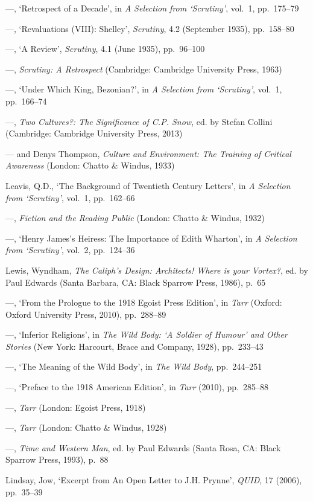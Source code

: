 \documentclass[]{article}
\begin{document}
---, `Retrospect of a Decade', in \emph{A Selection from `Scrutiny'},
vol.~1, pp.~175--79

---, `Revaluations (VIII): Shelley', \emph{Scrutiny}, 4.2 (September
1935), pp.~158--80

---, `A Review', \emph{Scrutiny}, 4.1 (June 1935), pp.~96--100

---, \emph{Scrutiny: A Retrospect} (Cambridge: Cambridge University
Press, 1963)

---, `Under Which King, Bezonian?', in \emph{A Selection from
`Scrutiny'}, vol.~1, pp.~166--74

---, \emph{Two Cultures?: The Significance of C.P. Snow}, ed. by Stefan
Collini (Cambridge: Cambridge University Press, 2013)

--- and Denys Thompson, \emph{Culture and Environment: The Training of
Critical Awareness} (London: Chatto \& Windus, 1933)

Leavis, Q.D., `The Background of Twentieth Century Letters', in \emph{A
Selection from `Scrutiny'}, vol.~1, pp.~162--66

---, \emph{Fiction and the Reading Public} (London: Chatto \& Windus,
1932)

---, `Henry James's Heiress: The Importance of Edith Wharton', in
\emph{A Selection from `Scrutiny'}, vol.~2, pp.~124--36

Lewis, Wyndham, \emph{The Caliph's Design: Architects! Where is your
Vortex?}, ed. by Paul Edwards (Santa Barbara, CA: Black Sparrow Press,
1986), p.~65

---, `From the Prologue to the 1918 Egoist Press Edition', in
\emph{Tarr} (Oxford: Oxford University Press, 2010), pp.~288--89

---, `Inferior Religions', in \emph{The Wild Body: `A Soldier of Humour'
and Other Stories} (New York: Harcourt, Brace and Company, 1928),
pp.~233--43

---, `The Meaning of the Wild Body', in \emph{The Wild Body},
pp.~244--251

---, `Preface to the 1918 American Edition', in \emph{Tarr} (2010),
pp.~285--88

---, \emph{Tarr} (London: Egoist Press, 1918)

---, \emph{Tarr} (London: Chatto \& Windus, 1928)

---, \emph{Time and Western Man}, ed. by Paul Edwards (Santa Rosa, CA:
Black Sparrow Press, 1993), p.~88

Lindsay, Jow, `Excerpt from An Open Letter to J.H. Prynne', \emph{QUID},
17 (2006), pp.~35--39
\end{document}
